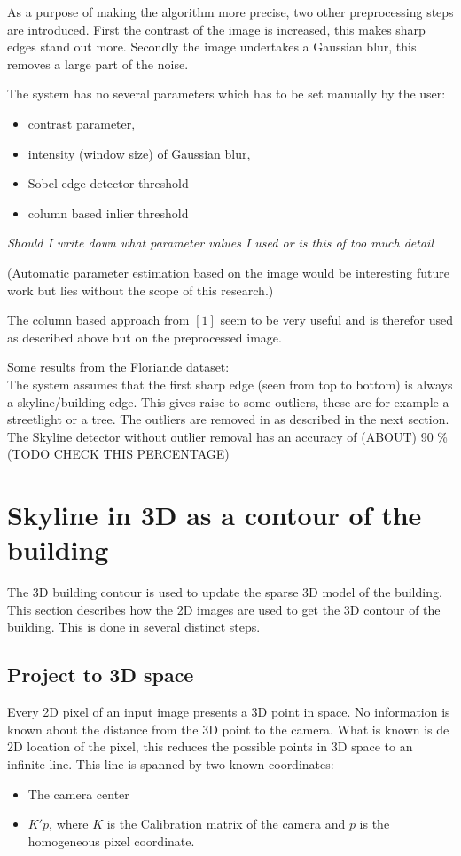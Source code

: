 \documentclass[10pt]{article}
\begin{document}
As a purpose of making the algorithm more precise, two other preprocessing
steps are introduced. First the contrast of the image is increased, this makes
sharp edges stand out more.  Secondly the image undertakes a Gaussian blur,
this removes a large part of the noise.

The system has no several parameters which has to be set manually by the user:
\begin{itemize}
\item contrast parameter, 
\item intensity (window size) of Gaussian blur,
\item Sobel edge detector threshold
\item column based inlier threshold
\end{itemize}
\textit{Should I write down what parameter values I used or is this of too much
detail}

(Automatic parameter estimation based on the image would be interesting future
work but lies without the scope of this research.)

The column based approach from $[1]$ seem to be very useful and is therefor
used as described above but on the preprocessed image.

Some results from the Floriande dataset:
\\
The system assumes that the first sharp edge (seen from top to bottom) is
always a skyline/building edge. This gives raise to some outliers, these are
for example a streetlight or a tree. The outliers are removed in as described in
the next section.  The Skyline detector without outlier removal has an
accuracy of (ABOUT) 90 \% (TODO CHECK THIS PERCENTAGE) 



\section{Skyline in 3D as a contour of the building}
The 3D building contour is used to update the sparse 3D model of the building.
This section describes how the 2D images are used to get the 3D contour of the
building. This is done in several distinct steps.  

\subsection{Project to 3D space}
Every 2D pixel of an input image presents a 3D point in space. No
information is known about the distance from the 3D point to the camera. What
is known is de 2D location of the pixel, this reduces the possible points in 3D
space to an infinite line.  This line is spanned by two known
coordinates:\\ 
\begin{itemize}
	\item The camera center %
	\item $K'p$, where $K$ is the Calibration matrix of the camera and $p$ is the homogeneous pixel coordinate.
\end{itemize}
\end{document}
